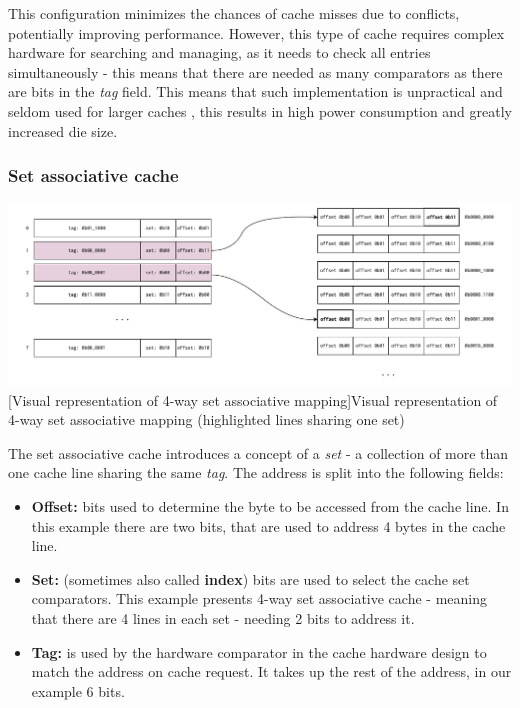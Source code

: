 \noindent This configuration minimizes the chances of cache misses due to conflicts, potentially improving performance. However, this type of cache requires complex hardware for
searching and managing, as it needs to check all entries simultaneously - this means that there are needed as many comparators as there are bits in the \textit{tag} field.
This means that such implementation is unpractical and seldom used for larger caches \cite{whatevery}, this results in high power consumption and greatly increased die size.

\subsubsection{Set associative cache}
\begin{center}
	\centering
	\includegraphics[width=\textwidth]{figures/02-background/set_ass_mem.pdf}
	[Visual representation of 4-way set associative mapping]{Visual representation of 4-way set associative mapping (highlighted lines sharing one set)}
	\label{fig:set_ass_mem}
\end{center}

\noindent The set associative cache introduces a concept of a \textit{set} - a collection of more than one cache line sharing the same \textit{tag}. The address is split into the following fields:

\begin{itemize}
	\item \textbf{Offset:} bits used to determine the byte to be accessed from the cache line. In this example there are two bits, that are used to address 4 bytes in the cache line.
	\item \textbf{Set:} (sometimes also called \textbf{index}) bits are used to select the cache set comparators. This example presents 4-way set associative cache - meaning that there are 4 lines
		in each set - needing 2 bits to address it.
	\item \textbf{Tag:} is used by the hardware comparator in the cache hardware design to match the address on cache request. It takes up the rest of the address, in our example 6 bits.
\end{itemize}


